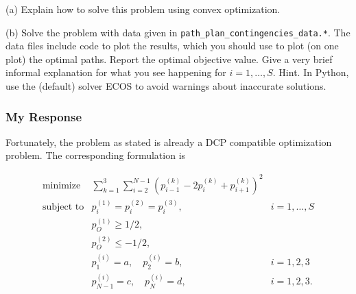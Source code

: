 \documentclass[12pt,reqno]{article}
\theoremstyle{definition}
\numberwithin{equation}{section}
\begin{document}
\vspace{0.1cm}
\noindent (a) Explain how to solve this problem using convex optimization.

\vspace{0.1cm}
\noindent (b) Solve the problem with data given in \lstinline|path_plan_contingencies_data.*|. The data files include code to plot the results,
which you should use to plot (on one plot) the optimal paths.
Report the optimal objective value. Give a very brief informal explanation for what you see happening for $i=1, \ldots, S$.
Hint. In Python, use the (default) solver ECOS to avoid warnings about inaccurate solutions.

\subsubsection*{My Response}

Fortunately, the problem as stated is already a DCP compatible optimization problem. The corresponding formulation is

\[\begin{array}{lll}
\text{minimize} \; & \sum_{k=1}^3 \sum_{i=2}^{N-1}\left(p_{i-1}^{(k)}-2 p_i^{(k)}+p_{i+1}^{(k)}\right)^2 & \\
\text{subject to} & p_{i}^{(1)} = p_{i}^{(2)} = p_{i}^{(3)}, & i = 1, \ldots, S \\
& p_{O}^{(1)} \ge 1/2, & \\
& p_{O}^{(2)} \le -1/2, & \\
& p^{(i)}_{1} = a, \quad p^{(i)}_{2} = b, & i = 1, 2, 3 \\
& p^{(i)}_{N-1} = c, \quad p^{(i)}_{N} = d, & i = 1, 2, 3.
\end{array}\]
\end{document}
